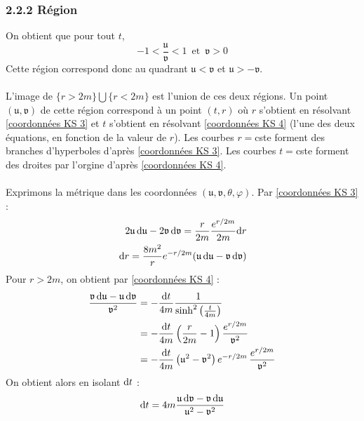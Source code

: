 \subsubsection{2.2.2 Région }
On obtient que pour tout $t$,
\begin{equation}
    - 1 < \frac{\mathfrak{u}}{\mathfrak{v}} <1 \,  \text{ et } \, \mathfrak{v}>0
\end{equation}
Cette région correspond donc au quadrant $\mathfrak{u} < \mathfrak{v}$ et $\mathfrak{u}> - \mathfrak{v}$.\\
\\
L'image de $\{r>2m\} \bigcup \{r <2m \}$ est l'union de ces deux régions. Un point $(\mathfrak{u},\mathfrak{v})$ de cette région correspond à un point $(t,r)$ où $r$ s'obtient en résolvant \ref{coordonnées KS 3} et $t$ s'obtient en résolvant \ref{coordonnées KS 4} (l'une des deux équations, en fonction de la valeur de $r$). Les courbes $r = $cste forment des branches d'hyperboles d'après \ref{coordonnées KS 3}. Les courbes $t=$cste forment des droites par l'orgine d'après \ref{coordonnées KS 4}.\\
\\
Exprimons la métrique dans les coordonnées $(\mathfrak{u},\mathfrak{v},\theta,\varphi)$. Par \ref{coordonnées KS 3} :
\begin{align}
    2 \mathfrak{u} \,\mathrm{d} \mathfrak{u} - 2 \mathfrak{v} \,\mathrm{d} \mathfrak{v} = \frac{r}{2m} \frac{e^{r/2m}}{2m} \mathrm{d} r\\
    \label{coordonnées KS 5}
    \,\mathrm{d} r = \frac{8m^2}{r} e^{-r/2m} (\mathfrak{u} \,\mathrm{d} \mathfrak{u} - \mathfrak{v}\, \mathrm{d} \mathfrak{v})
\end{align}
Pour $r>2m$, on obtient par \ref{coordonnées KS 4} :
\begin{align}
    \frac{\mathfrak{v} \,\mathrm{d} \mathfrak{u} - \mathfrak{u} \, \mathrm{d} \mathfrak{v}}{\mathfrak{v}^2} &= - \frac{\mathrm{d} t}{4m} \frac{1}{\sinh^2 \left( \frac{t}{4m}\right)}\\
    & = - \frac{\mathrm{d} t}{4m} \left( \frac{r}{2m} - 1 \right) \frac{e^{r/2m}}{\mathfrak{v}^2}\\
    & = - \frac{\mathrm{d} t}{4m} \left( \mathfrak{u}^2 - \mathfrak{v}^2 \right) e^{-r/2m}\, \frac{e^{r/2m}}{\mathfrak{v}^2}
\end{align}
On obtient alors en isolant $\mathrm{d} t$ :
\begin{equation}
    \label{coordonnées KS 6}
    \mathrm{d} t = 4m \frac{\mathfrak{u} \, \mathrm{d} \mathfrak{v} - \mathfrak{v} \, \mathrm{d} \mathfrak{u}}{\mathfrak{u}^2 - \mathfrak{v}^2} 
\end{equation}

